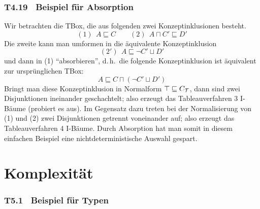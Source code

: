 \documentclass[fontsize=11pt, twoside=false, numbers=autoenddot]{scrbook}
\begin{document}
\section*{T4.19~ Beispiel für Absorption}

Wir betrachten die TBox, die aus folgenden zwei Konzeptinklusionen besteht.
%
\[
  (1)~~ A \sqsubseteq C
  \qquad
  (2)~~ A \sqcap C' \sqsubseteq D'
\]
Die zweite kann man umformen in die äquivalente Konzeptinklusion
\[
  (2')~~ A \sqsubseteq \lnot C' \sqcup D'
\]
und dann in (1) "`absorbieren"', d.\,h.\ die folgende Konzeptinklusion ist äquivalent
zur ursprünglichen TBox:
\[
  A \sqsubseteq C \sqcap (\lnot C' \sqcup D')
\]
Bringt man diese Konzeptinklusion in Normalform $\top \sqsubseteq C_\mathcal{T}$,
dann sind zwei Disjunktionen ineinander geschachtelt;
also erzeugt das Tableauverfahren 3 I-Bäume (probiert es aus).
Im Gegensatz dazu treten bei der Normalisierung von (1) und (2)
zwei Disjunktionen getrennt voneinander auf;
also erzeugt das Tableauverfahren 4 I-Bäume.
Durch Absorption hat man somit in diesem einfachen Beispiel
eine nichtdeterministische Auswahl gespart.

\goodbreak

\part{Komplexität}


\section*{T5.1~ Beispiel für Typen}
\end{document}
